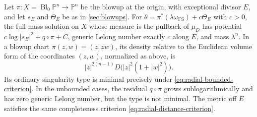 \begin{theorem}
Let $\pi:X=\operatorname{Bl}_0\mathbb P^n\to\mathbb P^n$ be the blowup at the origin, with exceptional divisor $E$, and let $s_E$ and $\Theta_E$ be as in \cref{sec:blowups}. For $\theta=\pi^*(\lambda\omega_{\mathrm{FS}})+c\Theta_E$ with $c>0$, the full-mass solution on $X$ whose measure is the pullback of $\mu_D$ has potential $c\log|s_E|^2+q\circ\pi+C$, generic Lelong number exactly $c$ along $E$, and mass $\lambda^n$. In a blowup chart $\pi(z,w)=(z,zw)$, its density relative to the Euclidean volume form of the coordinates $(z,w)$, normalized as above, is
\begin{equation}\label{eq:blowup-radial-density}
 |z|^{2(n-1)}D\bigl(|z|^2(1+|w|^2)\bigr).
\end{equation}
Its ordinary singularity type is minimal precisely under \eqref{eq:radial-bounded-criterion}. In the unbounded cases, the residual $q\circ\pi$ grows sublogarithmically and has zero generic Lelong number, but the type is not minimal. The metric off $E$ satisfies the same completeness criterion \eqref{eq:radial-distance-criterion}.
\end{theorem}

